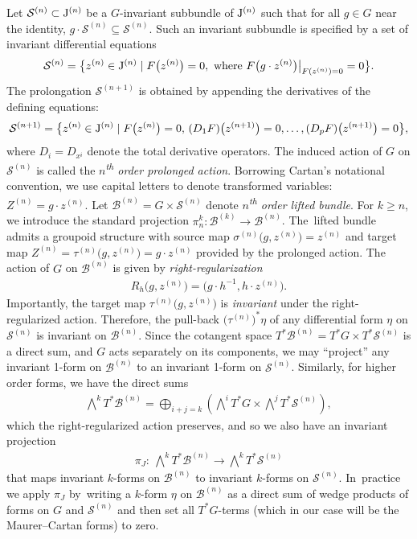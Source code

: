 \documentclass[pdftex]{sigma}%
\numberwithin{equation}{section}
\newcommand{\B}{\mathcal{B}}
\newcommand{\J}{{\rm J}}
\newcommand{\n}{^{(n)}}
\newcommand{\mS}{\mathcal{S}}
\begin{document}
Let $\mS\n \subset \J\n$ be a $G$-invariant subbundle of $\J\n$ such that for all $g \in G$ near the identity, $g\cdot \mS\n \subseteq \mS\n$. Such an invariant subbundle is specified by a set of invariant differential equations
%
\begin{gather}\label{eq:submanifold}
\mS\n = \big\{ z\n \in \J\n\mid F\big(z\n\big)=0,\ \text{where}\ F\big(g\cdot z\n\big)\big|_{F(z\n)=0} = 0\big\}.
\end{gather}
%
The prolongation $\mS^{(n+1)}$ is obtained by appending the derivatives of the defining equations:
\begin{gather*}
\mS^{(n+1)} = \big\{z\n \in \J\n\mid F\big(z\n\big)=0,\, (D_1 F)\big(z^{(n+1)}\big)=0, \dots, (D_pF)\big(z^{(n+1)}\big)=0\big\},
\end{gather*}
where $D_i = D_{x^i}$ denote the total derivative operators. The induced action of $G$ on $\mS\n$ is called the \emph{$n$\textsuperscript{th} order prolonged action}. Borrowing Cartan's notational convention, we use capital letters to denote transformed variables: $Z\n = g\cdot z\n$. Let $\B\n = G\times \mS\n$ denote \emph{$n$\textsuperscript{th} order lifted bundle}. For $k\geq n$, we introduce the standard projection $\pi^k_n\colon \B^{(k)}\to \B\n$. The~lif\-ted bundle admits a groupoid structure with source map $\sigma\n\big(g,z\n\big)=z\n$ and target map $Z\n = \tau\n\big(g,z\n\big) = g\cdot z\n$ provided by the prolonged action. The action of $G$ on $\B\n$ is given by \emph{right-regularization}
\begin{gather*}
R_h\big(g,z\n\big) = \big(g\cdot h^{-1},h\cdot z\n\big).
\end{gather*}
Importantly, the target map $\tau\n\big(g,z\n\big)$ is \emph{invariant} under the right-regularized action. Therefore, the pull-back $\big(\tau\n\big)^*\eta$ of any differential form $\eta$ on $\mS\n$ is invariant on $\B\n$. Since the cotangent space $T^*\B\n=T^*G\times T^*\mS\n$ is a direct sum, and $G$ acts separately on its components, we may ``project'' any invariant 1-form on $\B\n$ to an invariant 1-form on $\mS\n$. Similarly, for higher order forms, we have the direct sums
\begin{gather*}
\bigwedge\nolimits^kT^*\B\n=\bigoplus_{i+j=k}\left(\bigwedge\nolimits^iT^*G \times \bigwedge\nolimits^jT^*\mS\n\right)\!,
\end{gather*}
which the right-regularized action preserves, and so we also have an invariant projection
\begin{gather*}
\pi_J\colon\ \bigwedge\nolimits^kT^*\B\n \to \bigwedge\nolimits^kT^*\mS\n
\end{gather*}
that maps invariant $k$-forms on $\B\n$ to invariant $k$-forms on $\mS\n$. In~practice we apply $\pi_J$ by~writing a $k$-form $\eta$ on $\B\n$ as a direct sum of wedge products of forms on $G$ and $\mS\n$ and then set all $T^*G$-terms (which in our case will be the Maurer--Cartan forms) to zero.
\end{document}
